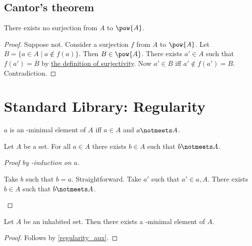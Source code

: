 \subsection{Cantor's theorem}


\begin{theorem}[Cantor]\label{cantor}
    There exists no surjection from $A$ to $\pow{A}$.
\end{theorem}
\begin{proof}
    Suppose not.
    Consider a surjection $f$ from $A$ to $\pow{A}$.
    Let $B = \{a \in A \mid a\notin f(a)\}$.
    Then $B\in\pow{A}$.
    There exists $a'\in A$ such that $f(a') = B$ by \hyperref[surj]{the definition of surjectivity}.
    Now $a' \in B$ iff $a' \notin f(a') = B$.
    Contradiction.
\end{proof}

\section{Standard Library: Regularity}

\begin{abbreviation}\label{elemminimal}
    $a$ is an \in-minimal element of $A$ iff
    $a\in A$ and $a\notmeets A$.
\end{abbreviation}

\begin{lemma}\label{regularity_aux}
    Let $A$ be a set.
    For all $a\in A$ there exists $b\in A$ such that
    $b\notmeets A$.
\end{lemma}
\begin{proof}[Proof by \in-induction on $a$]
    \begin{byCase}
            Take $b$ such that $b = a$.
            Straightforward.
            Take $a'$ such that $a'\in a, A$.
            There exists $b\in A$ such that $b\notmeets A$.
    \end{byCase}
\end{proof}

\begin{proposition}[Regularity]%
\label{regularity}
    Let $A$ be an inhabited set.
    Then there exists a \in-minimal element of $A$.
\end{proposition}
\begin{proof}
    Follows by \cref{regularity_aux}.
\end{proof}


